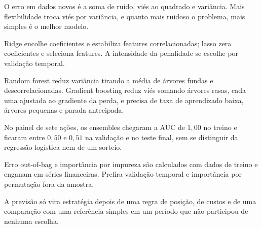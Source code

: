 \begin{resumo}
  \item O erro em dados novos é a soma de ruído, viés ao quadrado e variância. Mais flexibilidade troca viés por variância, e quanto mais ruidoso o problema, mais simples é o melhor modelo.
  \item Ridge encolhe coeficientes e estabiliza features correlacionadas; lasso zera coeficientes e seleciona features. A intensidade da penalidade se escolhe por validação temporal.
  \item Random forest reduz variância tirando a média de árvores fundas e descorrelacionadas. Gradient boosting reduz viés somando árvores rasas, cada uma ajustada ao gradiente da perda, e precisa de taxa de aprendizado baixa, árvores pequenas e parada antecipada.
  \item No painel de sete ações, os ensembles chegaram a AUC de $1,00$ no treino e ficaram entre $0,50$ e $0,51$ na validação e no teste final, sem se distinguir da regressão logística nem de um sorteio.
  \item Erro out-of-bag e importância por impureza são calculados com dados de treino e enganam em séries financeiras. Prefira validação temporal e importância por permutação fora da amostra.
  \item A previsão só vira estratégia depois de uma regra de posição, de custos e de uma comparação com uma referência simples em um período que não participou de nenhuma escolha.
\end{resumo}

